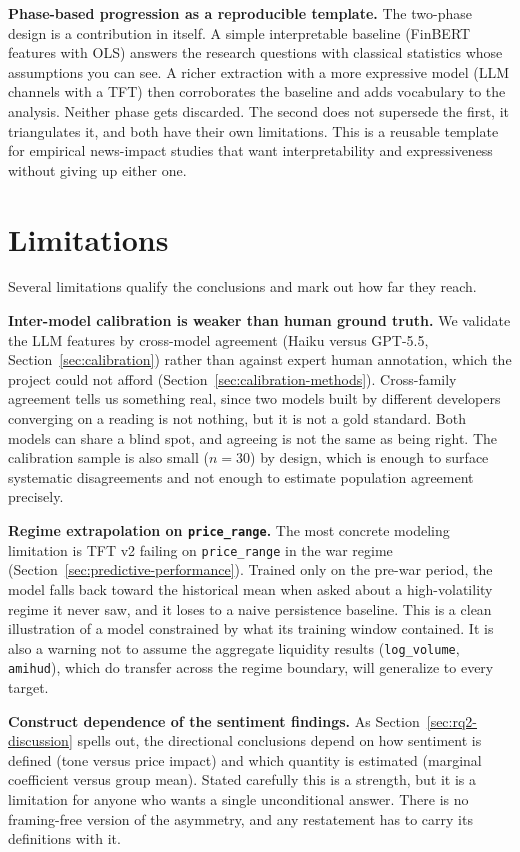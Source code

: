 \textbf{Phase-based progression as a reproducible template.} The two-phase design is a contribution in itself. A simple interpretable baseline (FinBERT features with OLS) answers the research questions with classical statistics whose assumptions you can see. A richer extraction with a more expressive model (LLM channels with a TFT) then corroborates the baseline and adds vocabulary to the analysis. Neither phase gets discarded. The second does not supersede the first, it triangulates it, and both have their own limitations. This is a reusable template for empirical news-impact studies that want interpretability and expressiveness without giving up either one.

\section{Limitations}\label{sec:limitations}

Several limitations qualify the conclusions and mark out how far they reach.

\textbf{Inter-model calibration is weaker than human ground truth.} We validate the LLM features by cross-model agreement (Haiku versus GPT-5.5, Section~\ref{sec:calibration}) rather than against expert human annotation, which the project could not afford (Section~\ref{sec:calibration-methods}). Cross-family agreement tells us something real, since two models built by different developers converging on a reading is not nothing, but it is not a gold standard. Both models can share a blind spot, and agreeing is not the same as being right. The calibration sample is also small (\emph{$n = 30$}) by design, which is enough to surface systematic disagreements and not enough to estimate population agreement precisely.

\textbf{Regime extrapolation on \texttt{price\_range}.} The most concrete modeling limitation is TFT v2 failing on \texttt{price\_range} in the war regime (Section~\ref{sec:predictive-performance}). Trained only on the pre-war period, the model falls back toward the historical mean when asked about a high-volatility regime it never saw, and it loses to a naive persistence baseline. This is a clean illustration of a model constrained by what its training window contained. It is also a warning not to assume the aggregate liquidity results (\texttt{log\_volume}, \texttt{amihud}), which do transfer across the regime boundary, will generalize to every target.

\textbf{Construct dependence of the sentiment findings.} As Section~\ref{sec:rq2-discussion} spells out, the directional conclusions depend on how sentiment is defined (tone versus price impact) and which quantity is estimated (marginal coefficient versus group mean). Stated carefully this is a strength, but it is a limitation for anyone who wants a single unconditional answer. There is no framing-free version of the asymmetry, and any restatement has to carry its definitions with it.

